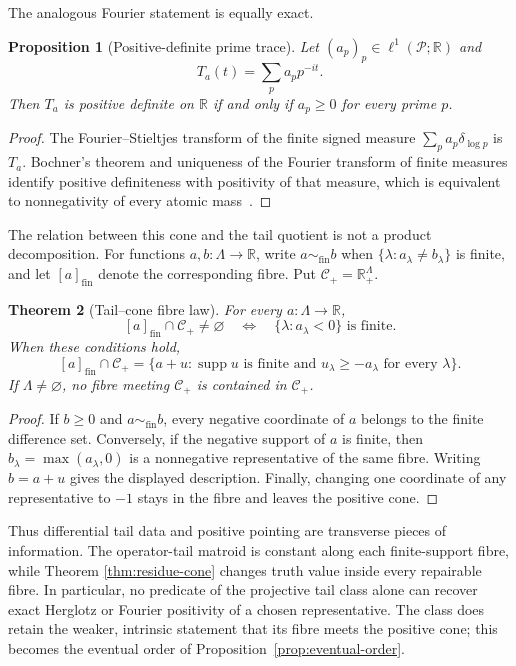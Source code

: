 \documentclass[11pt]{article}
\newtheorem{theorem}{Theorem}[section]
\newtheorem{proposition}[theorem]{Proposition}
\theoremstyle{definition}
\theoremstyle{remark}
\newcommand{\R}{\mathbb R}
\newcommand{\cP}{\mathcal P}
\newcommand{\supp}{\operatorname{supp}}
\begin{document}
The analogous Fourier statement is equally exact.

\begin{proposition}[Positive-definite prime trace]\label{prop:positive-trace}
Let \((a_p)_p\in\ell^1(\cP;\R)\) and
\[
  T_a(t)=\sum_pa_pp^{-it}.
\]
Then \(T_a\) is positive definite on \(\R\) if and only if \(a_p\geq0\) for every
prime \(p\).
\end{proposition}

\begin{proof}
The Fourier--Stieltjes transform of the finite signed measure
\(\sum_pa_p\delta_{\log p}\) is \(T_a\).  Bochner's theorem and uniqueness of the
Fourier transform of finite measures identify positive definiteness with positivity of that
measure, which is equivalent to nonnegativity of every atomic mass~\cite{RudinFourier}.
\end{proof}

The relation between this cone and the tail quotient is not a product decomposition.  For
functions \(a,b:\Lambda\to\R\), write \(a\sim_{\mathrm{fin}}b\) when
\(\{\lambda:a_\lambda\neq b_\lambda\}\) is finite, and let
\([a]_{\mathrm{fin}}\) denote the corresponding fibre.  Put
\(\mathcal C_+=\R_+^\Lambda\).

\begin{theorem}[Tail--cone fibre law]\label{thm:tail-cone-fibre}
For every \(a:\Lambda\to\R\),
\[
  [a]_{\mathrm{fin}}\cap\mathcal C_+\neq\varnothing
  \quad\Longleftrightarrow\quad
  \{\lambda:a_\lambda<0\}\text{ is finite}.
\]
When these conditions hold,
\[
  [a]_{\mathrm{fin}}\cap\mathcal C_+
  =\bigl\{a+u:\supp u\text{ is finite and }
                   u_\lambda\geq-a_\lambda\text{ for every }\lambda\bigr\}.
\]
If \(\Lambda\neq\varnothing\), no fibre meeting \(\mathcal C_+\) is contained in
\(\mathcal C_+\).
\end{theorem}

\begin{proof}
If \(b\geq0\) and \(a\sim_{\mathrm{fin}}b\), every negative coordinate of \(a\)
belongs to the finite difference set.  Conversely, if the negative support of \(a\) is finite,
then \(b_\lambda=\max(a_\lambda,0)\) is a nonnegative representative of the same fibre.
Writing \(b=a+u\) gives the displayed description.  Finally, changing one coordinate of any
representative to \(-1\) stays in the fibre and leaves the positive cone.
\end{proof}

Thus differential tail data and positive pointing are transverse pieces of information.  The
operator-tail matroid is constant along each finite-support fibre, while Theorem
\ref{thm:residue-cone} changes truth value inside every repairable fibre.  In particular, no
predicate of the projective tail class alone can recover exact Herglotz or Fourier positivity of
a chosen representative.  The class does retain the weaker, intrinsic statement that its fibre
meets the positive cone; this becomes the eventual order of
Proposition~\ref{prop:eventual-order}.
\end{document}
